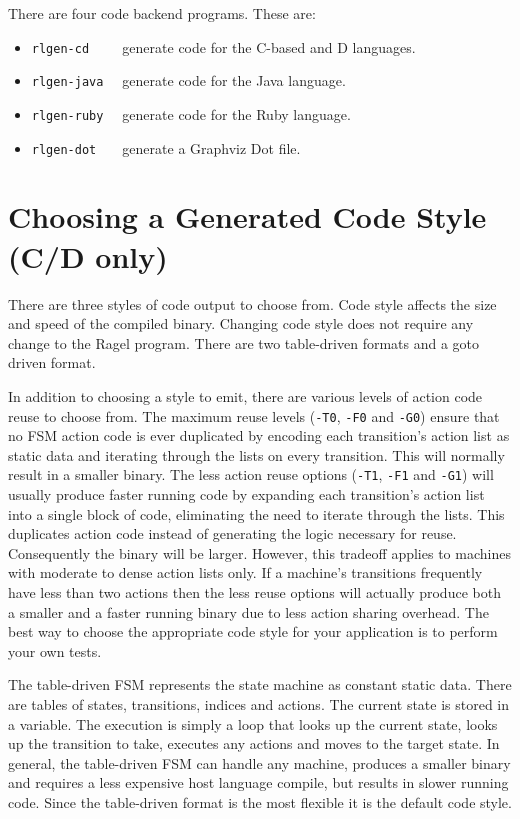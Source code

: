 \documentclass[letterpaper,11pt,oneside]{book}
\begin{document}
\noindent There are four code backend programs. These are:

\begin{itemize}
\item \verb|rlgen-cd    | generate code for the C-based and D languages.
\item \verb|rlgen-java  | generate code for the Java language.
\item \verb|rlgen-ruby  | generate code for the Ruby language.
\item \verb|rlgen-dot   | generate a Graphviz Dot file.
\end{itemize}

\section{Choosing a Generated Code Style (C/D only)}
\label{genout}

There are three styles of code output to choose from. Code style affects the
size and speed of the compiled binary. Changing code style does not require any
change to the Ragel program. There are two table-driven formats and a goto
driven format.

In addition to choosing a style to emit, there are various levels of action
code reuse to choose from.  The maximum reuse levels (\verb|-T0|, \verb|-F0|
and \verb|-G0|) ensure that no FSM action code is ever duplicated by encoding
each transition's action list as static data and iterating
through the lists on every transition. This will normally result in a smaller
binary. The less action reuse options (\verb|-T1|, \verb|-F1| and \verb|-G1|)
will usually produce faster running code by expanding each transition's action
list into a single block of code, eliminating the need to iterate through the
lists. This duplicates action code instead of generating the logic necessary
for reuse. Consequently the binary will be larger. However, this tradeoff applies to
machines with moderate to dense action lists only. If a machine's transitions
frequently have less than two actions then the less reuse options will actually
produce both a smaller and a faster running binary due to less action sharing
overhead. The best way to choose the appropriate code style for your
application is to perform your own tests.

The table-driven FSM represents the state machine as constant static data. There are
tables of states, transitions, indices and actions. The current state is
stored in a variable. The execution is simply a loop that looks up the current
state, looks up the transition to take, executes any actions and moves to the
target state. In general, the table-driven FSM can handle any machine, produces
a smaller binary and requires a less expensive host language compile, but
results in slower running code.  Since the table-driven format is the most
flexible it is the default code style.
\end{document}
